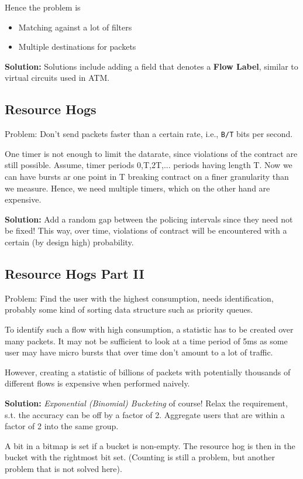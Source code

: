 Hence the problem is

\begin{itemize}
    \item Matching against a lot of filters
    \item Multiple destinations for packets
\end{itemize}

\textbf{Solution:} Solutions include adding a field that denotes a \textbf{Flow Label}, similar to virtual circuits used in ATM.

\subsection{Resource Hogs}

Problem: Don't send packets faster than a certain rate, i.e., \texttt{B/T} bits per second.

One timer is not enough to limit the datarate, since violations of the contract are still possible. Assume, timer periods 0,T,2T,... periods having length T. Now we can have bursts ar one point in T breaking contract on a finer granularity than we measure. Hence, we need multiple timers, which on the other hand are expensive.

\textbf{Solution:} Add a random gap between the policing intervals since they need not be fixed! This way, over time, violations of contract will be encountered with a certain (by design high) probability.

\subsection{Resource Hogs Part II}

Problem: Find the user with the highest consumption, needs identification, probably some kind of sorting data structure such as priority queues.

To identify such a flow with high consumption, a statistic has to be created over many packets. It may not be sufficient to look at a time period of 5ms as some user may have micro bursts that over time don't amount to a lot of traffic.

However, creating a statistic of billions of packets with potentially thousands of different flows is expensive when performed naively.

\textbf{Solution:} \textit{Exponential (Binomial) Bucketing} of course! Relax the requirement, s.t. the accuracy can be off by a factor of 2. Aggregate users that are within a factor of 2 into the same group.

A bit in a bitmap is set if a bucket is non-empty. The resource hog is then in the bucket with the rightmost bit set. (Counting is still a problem, but another problem that is not solved here).







































